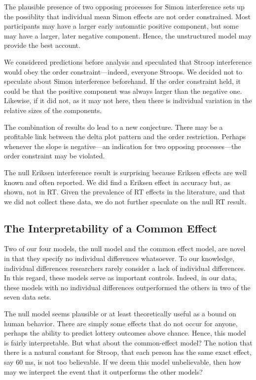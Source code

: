 \documentclass[american,man]{apa6}
\begin{document}
The plausible presence of two opposing processes for Simon interference
sets up the possiblity that individual mean Simon effects are not order
constrained. Most participants may have a larger early automatic
positive component, but some may have a larger, later negative
component. Hence, the unstructured model may provide the best account.

We considered predictions before analysis and speculated that Stroop
interference would obey the order constraint---indeed, everyone Stroops.
We decided not to speculate about Simon interference beforehand. If the
order constraint held, it could be that the positive component was
always larger than the negative one. Likewise, if it did not, as it may
not here, then there is individual variation in the relative sizes of
the components.

The combination of results do lead to a new conjecture. There may be a
profitable link between the delta plot pattern and the order
restriction. Perhaps whenever the slope is negative---an indication for
two opposing processes---the order constraint may be violated.

The null Eriksen interference result is surprising because Eriksen
effects are well known and often reported. We did find a Eriksen effect
in accuracy but, as shown, not in RT. Given the prevalence of RT effects
in the literature, and that we did not collect these data, we do not
further speculate on the null RT result.

\subsection{The Interpretability of a Common
Effect}\label{the-interpretability-of-a-common-effect}

Two of our four models, the null model and the common effect model, are
novel in that they specify no individual differences whatsoever. To our
knowledge, individual differences researchers rarely consider a lack of
individual differences. In this regard, these models serve as important
controls. Indeed, in our data, these models with no individual
differences outperformed the others in two of the seven data sets.

The null model seems plausible or at least theoretically useful as a
bound on human behavior. There are simply some effects that do not occur
for anyone, perhaps the ability to predict lottery outcomes above
chance. Hence, this model is fairly interpretable. But what about the
common-effect model? The notion that there is a natural constant for
Stroop, that each person has the same exact effect, say 60 ms, is not
too believable. If we deem this model unbelievable, then how may we
interpret the event that it outperforms the other models?
\end{document}
